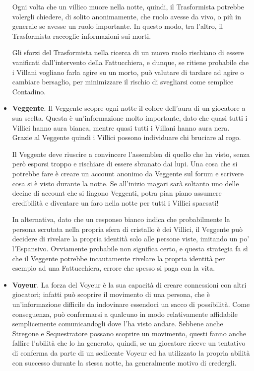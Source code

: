 \documentclass[a4paper,10pt]{article}
\begin{document}
\begin{itemize}
    Ogni volta che un villico muore nella notte, quindi,  il Trasformista potrebbe volergli chiedere, di solito anonimamente, che ruolo avesse da vivo, o più in generale se avesse un ruolo importante. In questo modo, tra l’altro, il Trasformista raccoglie informazioni sui morti.
    
    Gli sforzi del Trasformista nella ricerca di un nuovo ruolo rischiano di essere vanificati dall’intervento della Fattucchiera, e dunque, se ritiene probabile che i Villani vogliano farla agire su un morto, può valutare di tardare ad agire o cambiare bersaglio, per minimizzare il rischio di svegliarsi come semplice Contadino.
	
	\item {\bf Veggente}. Il Veggente scopre ogni notte il colore dell'aura di un giocatore a sua scelta.
    Questa è un'informazione molto importante, dato che quasi tutti i Villici hanno aura bianca, mentre quasi tutti i Villani hanno aura nera. Grazie al Veggente quindi i Villici possono individuare chi bruciare al rogo.
    
    Il Veggente deve riuscire a convincere l'assemblea di quello che ha visto, senza però esporsi troppo e rischiare di essere sbranato dai lupi. Una cosa che si potrebbe fare è creare un account anonimo da Veggente sul forum e scrivere cosa si è visto durante la notte. Se all'inizio magari sarà soltanto uno delle decine di account che si fingono Veggenti, potra pian piano assumere credibilità e diventare un faro nella notte per tutti i Villici spaesati!
    
    In alternativa, dato che un responso bianco indica che probabilmente la persona scrutata nella propria sfera di cristallo è dei Villici, il Veggente può decidere di rivelare la propria identità solo alle persone viste, imitando un po' l'Espansivo. Ovviamente probabile non significa certo, e questa strategia fa sì che il Veggente potrebbe incautamente rivelare la propria identità per esempio ad una Fattucchiera, errore che spesso si paga con la vita.
	
	\item {\bf Voyeur}. La forza del Voyeur è la sua capacità di creare connessioni con altri giocatori; infatti può scoprire il movimento di una persona, che è un'informazione difficile da indovinare essendoci un sacco di possibilità. Come conseguenza, può confermarsi a qualcuno in modo relativamente affidabile semplicemente comunicandogli dove l'ha visto andare. Sebbene anche Stregone e Sequestratore possano scoprire un movimento, questi fanno anche fallire l'abilità che lo ha generato, quindi, se un giocatore riceve un tentativo di conferma da parte di un sedicente Voyeur ed ha utilizzato la propria abilità con successo durante la stessa notte, ha generalmente motivo di credergli.
	

\end{itemize}
\end{document}
